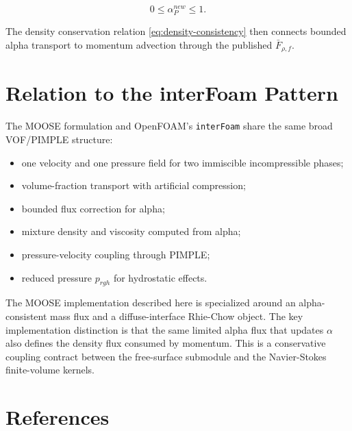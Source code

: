 \documentclass[11pt]{article}
\begin{document}
\begin{equation}
  0\le\alpha_P^{new}\le 1.
\end{equation}

The density conservation relation \eqref{eq:density-consistency} then connects
bounded alpha transport to momentum advection through the published
\(\bar{F}_{\rho,f}\).

\section{Relation to the interFoam Pattern}

The MOOSE formulation and OpenFOAM's \texttt{interFoam} share the same broad
VOF/PIMPLE structure:

\begin{itemize}[leftmargin=2.5em]
  \item one velocity and one pressure field for two immiscible incompressible
        phases;
  \item volume-fraction transport with artificial compression;
  \item bounded flux correction for alpha;
  \item mixture density and viscosity computed from alpha;
  \item pressure-velocity coupling through PIMPLE;
  \item reduced pressure \(p_{rgh}\) for hydrostatic effects.
\end{itemize}

The MOOSE implementation described here is specialized around an
alpha-consistent mass flux and a diffuse-interface Rhie-Chow object.  The key
implementation distinction is that the same limited alpha flux that updates
\(\alpha\) also defines the density flux consumed by momentum.  This is a
conservative coupling contract between the free-surface submodule and the
Navier-Stokes finite-volume kernels.

\section{References}
\end{document}
